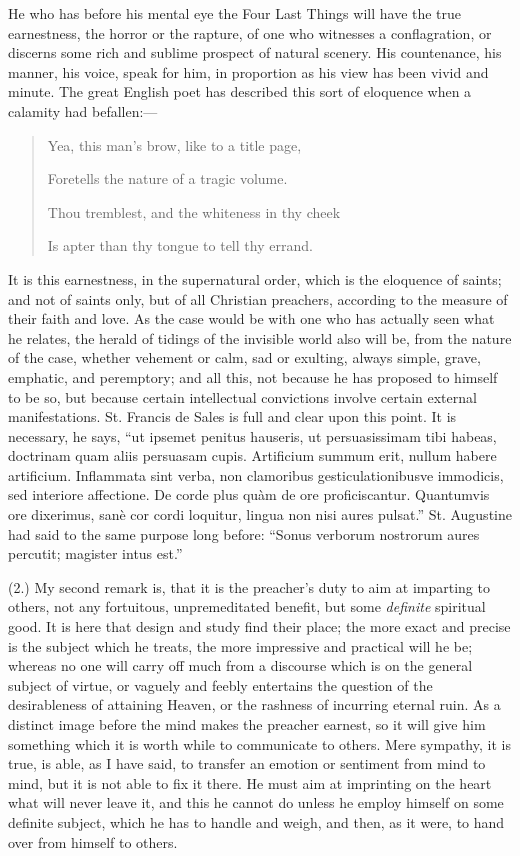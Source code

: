 He who has before his mental eye the Four Last Things will have the
true earnestness, the horror or the rapture, of one who witnesses a
conflagration, or discerns some rich and sublime prospect of natural
scenery. His countenance, his manner, his voice, speak for him, in
proportion as his view has been vivid and minute. The great
English poet has described this sort of eloquence when a calamity had
befallen:—

\begin{quote}

Yea, this man's brow, like to a title page,

Foretells the nature of a tragic volume.

Thou tremblest, and the whiteness in thy cheek

Is apter than thy tongue to tell thy errand.

\end{quote}

It is this earnestness, in the supernatural order, which is the
eloquence of saints; and not of saints only, but of all Christian
preachers, according to the measure of their faith and love. As the
case would be with one who has actually seen what he relates, the
herald of tidings of the invisible world also will be, from the nature
of the case, whether vehement or calm, sad or exulting, always simple,
grave, emphatic, and peremptory; and all this, not because he has
proposed to himself to be so, but because certain intellectual
convictions involve certain external manifestations. St. Francis de
Sales is full and clear upon this point. It is necessary, he says,
``ut ipsemet penitus hauseris, ut persuasissimam tibi habeas,
doctrinam quam aliis persuasam cupis. Artificium summum erit, nullum
habere artificium. Inflammata sint verba, non clamoribus
gesticulationibusve immodicis, sed interiore affectione. De corde plus
quàm de ore proficiscantur. Quantumvis ore dixerimus, sanè cor cordi
loquitur, lingua non nisi aures pulsat.'' St. Augustine had said
to the same purpose long before: ``Sonus verborum nostrorum aures
percutit; magister intus est.''

(2.) My second remark is, that it is the preacher's duty to aim at
imparting to others, not any fortuitous, unpremeditated benefit, but
some \emph{definite} spiritual good. It is here that design and study
find their place; the more exact and precise is the subject
which he treats, the more impressive and practical will he be; whereas
no one will carry off much from a discourse which is on the general
subject of virtue, or vaguely and feebly entertains the question of
the desirableness of attaining Heaven, or the rashness of incurring
eternal ruin. As a distinct image before the mind makes the preacher
earnest, so it will give him something which it is worth while to
communicate to others. Mere sympathy, it is true, is able, as I have
said, to transfer an emotion or sentiment from mind to mind, but it is
not able to fix it there. He must aim at imprinting on the heart what
will never leave it, and this he cannot do unless he employ himself on
some definite subject, which he has to handle and weigh, and then, as
it were, to hand over from himself to others.

